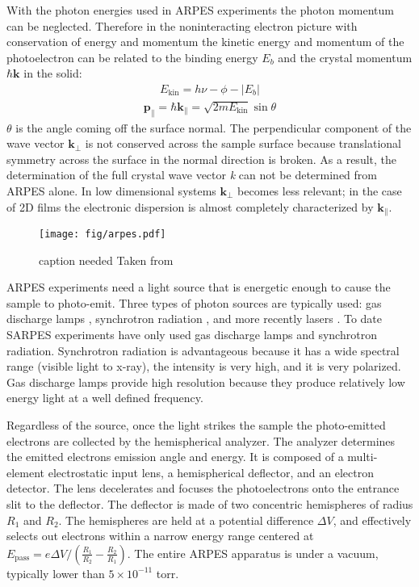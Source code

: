 \documentclass[12pt]{article}
\begin{document}
With the photon energies used in ARPES experiments the photon momentum can be neglected.
Therefore in the noninteracting electron picture with conservation of energy and momentum the kinetic energy and momentum of the photoelectron can be related to the binding energy $E_b$ and the crystal momentum $\hbar\boldsymbol{k}$ in the solid\cite{Damascelli}:
\begin{align}
  E_{\text{kin}}=h\nu-\phi-|E_b|
\end{align}
\begin{align}
  \boldsymbol{p_{\parallel}}=\hbar\boldsymbol{k_{\parallel}}=\sqrt{2mE_{\text{kin}}}\sin\theta
\end{align}
$\theta$ is the angle coming off the surface normal.
The perpendicular component of the wave vector $\boldsymbol{k_{\perp}}$ is not conserved across the sample surface because translational symmetry across the surface in the normal direction is broken.  
As a result, the determination of the full crystal wave vector \emph{k} can not be determined from ARPES alone.
In low dimensional systems $\boldsymbol{k_{\perp}}$ becomes less relevant; in the case of 2D films the electronic dispersion is almost completely characterized by $\boldsymbol{k_{\parallel}}$.

\begin{figure}[h]
  \centering
  \texttt{[image: fig/arpes.pdf]}
  \caption[should I put this here?]
  {caption needed Taken from \cite{Damascelli}}
  \label{fig:asymmetry}
\end{figure}
ARPES experiments need a light source that is energetic enough to cause the sample to photo-emit.
Three types of photon sources are typically used:  gas discharge lamps \cite{Damascelli}, synchrotron radiation \cite{Damascelli}, and more recently lasers \cite{Dessau}.
To date SARPES experiments have only used gas discharge lamps and synchrotron radiation.
Synchrotron radiation is advantageous because it has a wide spectral range (visible light to x-ray), the intensity is very high, and it is very polarized.
Gas discharge lamps provide high resolution because they produce relatively low energy light at a well defined frequency.

Regardless of the source, once the light strikes the sample the photo-emitted electrons are collected by the hemispherical analyzer.
The analyzer determines the emitted electrons emission angle and energy.
It is composed of a multi-element electrostatic input lens, a hemispherical deflector, and an electron detector.
The lens decelerates and focuses the photoelectrons onto the entrance slit to the deflector.
The deflector is made of two concentric hemispheres of radius $R_1$ and $R_2$.
The hemispheres are held at a potential difference $\Delta V$, and effectively selects out electrons within a narrow energy range centered at $E_{\text{pass}}=e\Delta V / (\frac{R_1}{R_2}-\frac{R_2}{R_1})$.
The entire ARPES apparatus is under a vacuum, typically lower than $5\times10^{-11}$ torr.
\end{document}
